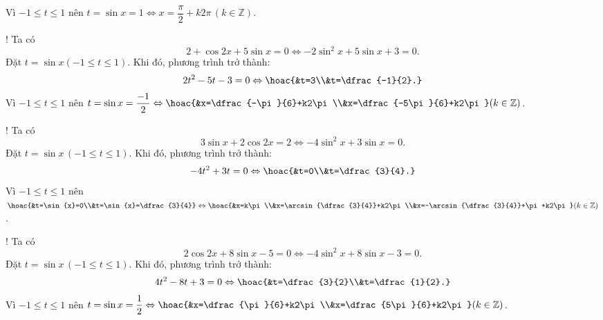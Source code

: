 \begin{bt}
{\begin{listEX}[2]
$$			$$
			Vì $-1\le t\le 1$ nên $t=\sin{x}=1\Leftrightarrow x=\dfrac{\pi}{2}+k2\pi\,(k\in\mathbb{Z})$.
			\item! Ta có
			$$
			2+\cos{2x}+5\sin{x}=0 \Leftrightarrow -2\sin^2{x}+5\sin{x}+3=0.
			$$
			Đặt $t=\sin{x}(-1\le t\le 1)$. Khi đó, phương trình trở thành:
			$$
			2t^2-5t-3=0 \Leftrightarrow \hoac{&t=3\\&t=\dfrac{-1}{2}.}
			$$
			Vì $-1\le t\le 1$ nên $t=\sin{x}=\dfrac{-1}{2}\Leftrightarrow\hoac{&x=\dfrac{-\pi}{6}+k2\pi\\&x=\dfrac{-5\pi}{6}+k2\pi}(k\in\mathbb{Z})$.
			\item! Ta có
			$$
			3\sin{x}+2\cos{2x}=2 \Leftrightarrow -4\sin^2{x}+3\sin{x}=0.
			$$
			Đặt $t=\sin{x}\,(-1\le t\le 1)$. Khi đó, phương trình trở thành:
			$$
			-4t^2+3t=0 \Leftrightarrow \hoac{&t=0\\&t=\dfrac{3}{4}.}
			$$
			Vì $-1\le t\le 1$ nên $\hoac{&t=\sin{x}=0\\&t=\sin{x}=\dfrac{3}{4}}\Leftrightarrow \hoac{&x=k\pi\\&x=\arcsin{\dfrac{3}{4}}+k2\pi\\&x=-\arcsin{\dfrac{3}{4}}+\pi+k2\pi}(k\in\mathbb{Z})$.
			\item! Ta có
			$$
			2\cos{2x}+8\sin{x}-5=0 \Leftrightarrow -4\sin^2{x}+8\sin{x}-3=0.
			$$
			Đặt $t=\sin{x}\,(-1\le t\le 1)$. Khi đó, phương trình trở thành:
			$$
			4t^2-8t+3=0 \Leftrightarrow \hoac{&t=\dfrac{3}{2}\\&t=\dfrac{1}{2}.}
			$$
			Vì $-1\le t\le 1$ nên $t=\sin{x}=\dfrac{1}{2}\Leftrightarrow\hoac{&x=\dfrac{\pi}{6}+k2\pi\\&x=\dfrac{5\pi}{6}+k2\pi}(k\in\mathbb{Z})$.
		\end{listEX}
	}
\end{bt}



